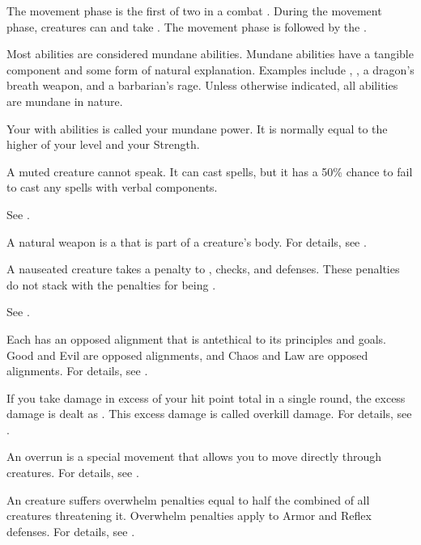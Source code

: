  The movement phase is the first of two  in a combat .
During the movement phase, creatures can  and take .
The movement phase is followed by the .

 Most abilities are considered mundane abilities.
Mundane abilities have a tangible component and some form of natural explanation.
Examples include , , a dragon's breath weapon, and a barbarian's rage.
Unless otherwise indicated, all abilities are mundane in nature.

 Your  with  abilities is called your mundane power.
It is normally equal to the higher of your level and your Strength.

 A muted creature cannot speak.
It can cast spells, but it has a 50\% chance to fail to cast any spells with verbal components.

 See .

 A natural weapon is a  that is part of a creature's body.
For details, see .

 A nauseated creature takes a  penalty to , checks, and defenses.
These penalties do not stack with the penalties for being \sickened.

 See .

 Each  has an opposed alignment that is antethical to its principles and goals.
Good and Evil are opposed alignments, and Chaos and Law are opposed alignments.
For details, see .

 If you take damage in excess of your  hit point total in a single round, the excess damage is dealt as .
This excess damage is called overkill damage.
For details, see .

 An overrun is a special movement that allows you to move directly through creatures.
For details, see .

 An  creature suffers overwhelm penalties equal to half the combined  of all creatures threatening it.
Overwhelm penalties apply to Armor and Reflex defenses.
For details, see .


